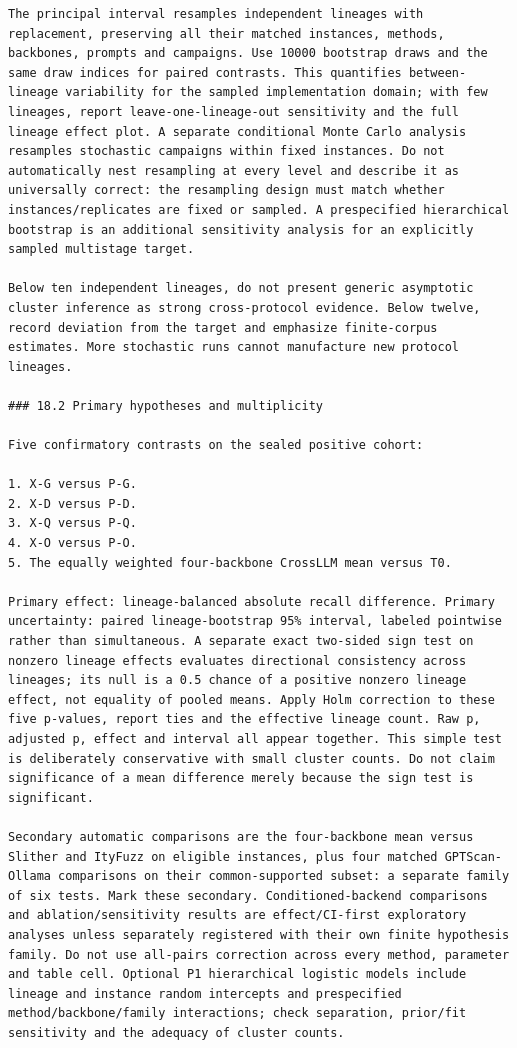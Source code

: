 \documentclass[11pt,a4paper]{article}
\begin{document}
\begin{verbatim}
The principal interval resamples independent lineages with replacement, preserving all their matched instances, methods, backbones, prompts and campaigns. Use 10000 bootstrap draws and the same draw indices for paired contrasts. This quantifies between-lineage variability for the sampled implementation domain; with few lineages, report leave-one-lineage-out sensitivity and the full lineage effect plot. A separate conditional Monte Carlo analysis resamples stochastic campaigns within fixed instances. Do not automatically nest resampling at every level and describe it as universally correct: the resampling design must match whether instances/replicates are fixed or sampled. A prespecified hierarchical bootstrap is an additional sensitivity analysis for an explicitly sampled multistage target.

Below ten independent lineages, do not present generic asymptotic cluster inference as strong cross-protocol evidence. Below twelve, record deviation from the target and emphasize finite-corpus estimates. More stochastic runs cannot manufacture new protocol lineages.

### 18.2 Primary hypotheses and multiplicity

Five confirmatory contrasts on the sealed positive cohort:

1. X-G versus P-G.
2. X-D versus P-D.
3. X-Q versus P-Q.
4. X-O versus P-O.
5. The equally weighted four-backbone CrossLLM mean versus T0.

Primary effect: lineage-balanced absolute recall difference. Primary uncertainty: paired lineage-bootstrap 95% interval, labeled pointwise rather than simultaneous. A separate exact two-sided sign test on nonzero lineage effects evaluates directional consistency across lineages; its null is a 0.5 chance of a positive nonzero lineage effect, not equality of pooled means. Apply Holm correction to these five p-values, report ties and the effective lineage count. Raw p, adjusted p, effect and interval all appear together. This simple test is deliberately conservative with small cluster counts. Do not claim significance of a mean difference merely because the sign test is significant.

Secondary automatic comparisons are the four-backbone mean versus Slither and ItyFuzz on eligible instances, plus four matched GPTScan-Ollama comparisons on their common-supported subset: a separate family of six tests. Mark these secondary. Conditioned-backend comparisons and ablation/sensitivity results are effect/CI-first exploratory analyses unless separately registered with their own finite hypothesis family. Do not use all-pairs correction across every method, parameter and table cell. Optional P1 hierarchical logistic models include lineage and instance random intercepts and prespecified method/backbone/family interactions; check separation, prior/fit sensitivity and the adequacy of cluster counts.


\end{verbatim}
\end{document}
